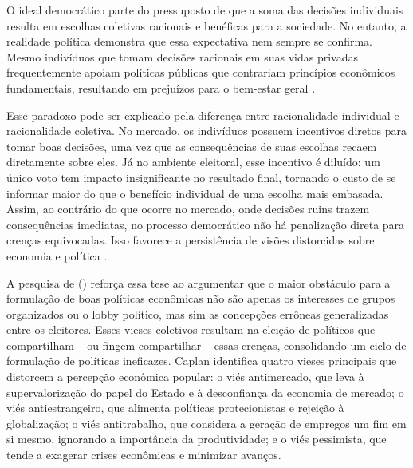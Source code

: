 
O ideal democrático parte do pressuposto de que a soma das decisões individuais resulta em escolhas coletivas racionais e benéficas para a sociedade. No entanto, a realidade política demonstra que essa expectativa nem sempre se confirma. Mesmo indivíduos que tomam decisões racionais em suas vidas privadas frequentemente apoiam políticas públicas que contrariam princípios econômicos fundamentais, resultando em prejuízos para o bem-estar geral \cite{downs1957economic,The_Myth_of_the_Rational_Voter}.  

Esse paradoxo pode ser explicado pela diferença entre racionalidade individual e racionalidade coletiva. No mercado, os indivíduos possuem incentivos diretos para tomar boas decisões, uma vez que as consequências de suas escolhas recaem diretamente sobre eles. Já no ambiente eleitoral, esse incentivo é diluído: um único voto tem impacto insignificante no resultado final, tornando o custo de se informar maior do que o benefício individual de uma escolha mais embasada. Assim, ao contrário do que ocorre no mercado, onde decisões ruins trazem consequências imediatas, no processo democrático não há penalização direta para crenças equivocadas. Isso favorece a persistência de visões distorcidas sobre economia e política \cite{bastiat1859sofismas,downs1957economic,The_Myth_of_the_Rational_Voter}.

A pesquisa de  (\citeyear{The_Myth_of_the_Rational_Voter}) reforça essa tese ao argumentar que o maior obstáculo para a formulação de boas políticas econômicas não são apenas os interesses de grupos organizados ou o lobby político, mas sim as concepções errôneas generalizadas entre os eleitores. Esses vieses coletivos resultam na eleição de políticos que compartilham – ou fingem compartilhar – essas crenças, consolidando um ciclo de formulação de políticas ineficazes. Caplan identifica quatro vieses principais que distorcem a percepção econômica popular: o viés antimercado, que leva à supervalorização do papel do Estado e à desconfiança da economia de mercado; o viés antiestrangeiro, que alimenta políticas protecionistas e rejeição à globalização; o viés antitrabalho, que considera a geração de empregos um fim em si mesmo, ignorando a importância da produtividade; e o viés pessimista, que tende a exagerar crises econômicas e minimizar avanços.

